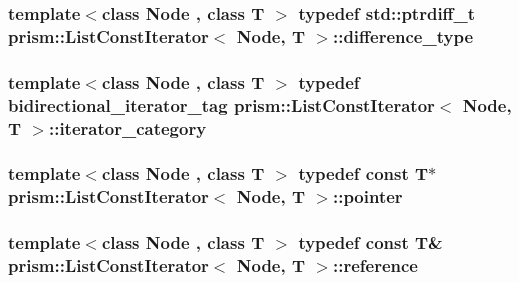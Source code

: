 \subsubsection[{\texorpdfstring{difference\+\_\+type}{difference_type}}]{\setlength{\rightskip}{0pt plus 5cm}template$<$class Node , class T $>$ typedef std\+::ptrdiff\+\_\+t {\bf prism\+::\+List\+Const\+Iterator}$<$ Node, T $>$\+::{\bf difference\+\_\+type}}\hypertarget{structprism_1_1_list_const_iterator_a16d9c896e7353dc34db8cd8e0edbf40d}{}\label{structprism_1_1_list_const_iterator_a16d9c896e7353dc34db8cd8e0edbf40d}
\subsubsection[{\texorpdfstring{iterator\+\_\+category}{iterator_category}}]{\setlength{\rightskip}{0pt plus 5cm}template$<$class Node , class T $>$ typedef bidirectional\+\_\+iterator\+\_\+tag {\bf prism\+::\+List\+Const\+Iterator}$<$ Node, T $>$\+::{\bf iterator\+\_\+category}}\hypertarget{structprism_1_1_list_const_iterator_a6cf9898af1bc61457d9f8331a95bb1fa}{}\label{structprism_1_1_list_const_iterator_a6cf9898af1bc61457d9f8331a95bb1fa}
\subsubsection[{\texorpdfstring{pointer}{pointer}}]{\setlength{\rightskip}{0pt plus 5cm}template$<$class Node , class T $>$ typedef const T$\ast$ {\bf prism\+::\+List\+Const\+Iterator}$<$ Node, T $>$\+::{\bf pointer}}\hypertarget{structprism_1_1_list_const_iterator_a1c92e5a7b7d0a92c744027ca421cb651}{}\label{structprism_1_1_list_const_iterator_a1c92e5a7b7d0a92c744027ca421cb651}
\subsubsection[{\texorpdfstring{reference}{reference}}]{\setlength{\rightskip}{0pt plus 5cm}template$<$class Node , class T $>$ typedef const T\& {\bf prism\+::\+List\+Const\+Iterator}$<$ Node, T $>$\+::{\bf reference}}\hypertarget{structprism_1_1_list_const_iterator_ad35238dd195319f3f07c12769b52b472}{}\label{structprism_1_1_list_const_iterator_ad35238dd195319f3f07c12769b52b472}
